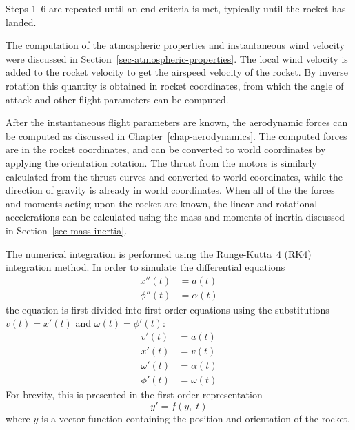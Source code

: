 Steps 1--6 are repeated until an end criteria is met, typically until
the rocket has landed.

The computation of the atmospheric properties and instantaneous wind
velocity were discussed in Section~\ref{sec-atmospheric-properties}.
The local wind velocity is added to the rocket velocity to get the
airspeed velocity of the rocket.  By inverse rotation this quantity is
obtained in rocket coordinates, from which the angle of attack and
other flight parameters can be computed.

After the instantaneous flight parameters are known, the aerodynamic
forces can be computed as discussed in
Chapter~\ref{chap-aerodynamics}.  The computed forces are in the
rocket coordinates, and can be converted to world coordinates by
applying the orientation rotation.  The thrust from the motors is
similarly calculated from the thrust curves and converted to world
coordinates, while the direction of gravity is already in world
coordinates.  When all of the the forces and moments acting upon the
rocket are known, the linear and rotational accelerations can be
calculated using the mass and moments of inertia discussed in
Section~\ref{sec-mass-inertia}.

The numerical integration is performed using the Runge-Kutta~4 (RK4)
integration method.  In order to simulate the differential equations
%
\begin{equation}
\begin{split}
x''(t) &= a(t) \\
\phi''(t) &= \alpha(t)
\end{split}
\end{equation}
%
the equation is first divided into first-order equations using the
substitutions $v(t)=x'(t)$ and $\omega(t)=\phi'(t)$:
%
\begin{equation}
\begin{split}
v'(t) &= a(t) \\
x'(t) &= v(t) \\
\omega'(t) &= \alpha(t) \\
\phi'(t)   &= \omega(t)
\end{split}
\end{equation}
%
For brevity, this is presented in the first order representation
%
\begin{equation}
y' = f(y,\; t)
\end{equation}
%
where $y$ is a vector function containing the position and orientation
of the rocket.

